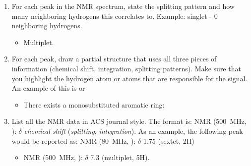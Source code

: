\documentclass[titlepage]{article}
\begin{document}
\begin{enumerate}
\begin{itemize}
    \end{itemize}
    \item For each peak in the  NMR spectrum, state the splitting pattern and how many neighboring hydrogens this correlates to. Example: singlet - 0 neighboring hydrogens.
    \begin{itemize}
        \item Multiplet.
    \end{itemize}
    \item For each peak, draw a partial structure that uses all three pieces of information (chemical shift, integration, splitting patterns). Make sure that you highlight the hydrogen atom or atoms that are responsible for the signal. An example of this is  or
    \begin{center}
        \footnotesize
    \end{center}
    \begin{itemize}
        \item There exists a monosubstituted aromatic ring:
        \begin{center}
        \end{center}
    \end{itemize}
    \item List all the  NMR data in ACS journal style. The format is:  NMR (\SI{500}{\mega\hertz}, ): $\delta$ \emph{chemical shift} (\emph{splitting}, \emph{integration}). As an example, the following peak would be reported as:  NMR (\SI{80}{\mega\hertz}, ): $\delta$ 1.75 (sextet, 2H)
    \begin{center}
    \end{center}
    \begin{itemize}
        \item {} NMR (\SI{500}{\mega\hertz}, ): $\delta$ 7.3 (multiplet, 5H).
    \end{itemize}
\end{enumerate}
\end{document}
